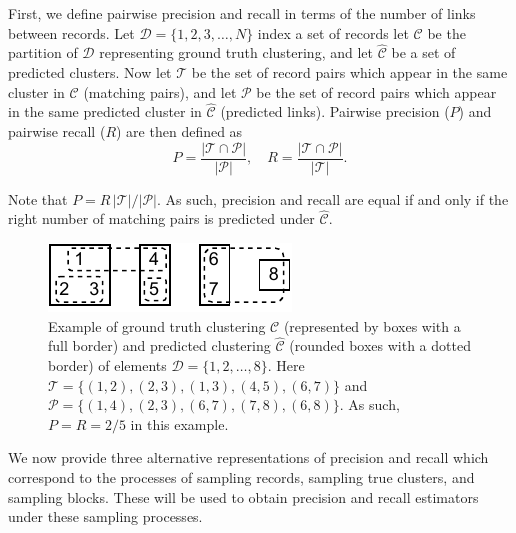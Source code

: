 \documentclass[fontsize=11pt]{article}
\newcommand{\ob}[1]{{\color{purple}#1}}
\theoremstyle{definition}
\begin{document}
First, we define pairwise precision and recall in terms of the number of links between records. Let $\mathcal{D} = \{1, 2, 3, \dots, N\}$ index a set of records let $\mathcal{C}$ be the partition of $\mathcal{D}$ representing ground truth clustering, and let $\widehat{\mathcal{C}}$ be a set of predicted clusters. Now let $\mathcal{T}$ be the set of record pairs which appear in the same cluster in $\mathcal{C}$ (matching pairs), and let $\mathcal{P}$ be the set of record pairs which appear in the same predicted cluster in $\widehat{\mathcal{C}}$ (predicted links). Pairwise precision ($P$) and pairwise recall ($R$) are then defined as
\begin{equation}\label{eq:def_P_R}
    P = \frac{\lvert \mathcal{T} \cap \mathcal{P} \rvert}{\lvert \mathcal{P} \rvert}, \quad R = \frac{\lvert \mathcal{T} \cap \mathcal{P} \rvert}{\lvert \mathcal{T} \rvert}.
\end{equation}

Note that $P = R \, \lvert \mathcal{T} \rvert / \lvert \mathcal{P} \rvert$. As such, precision and recall are equal if and only if the right number of matching pairs is predicted under $\widehat{\mathcal{C}}$.

\begin{figure}[h]
    \centering
    \includegraphics{paper/clustering-example.pdf}
    \caption{\ob{Example of ground truth clustering $\mathcal{C}$ (represented by boxes with a full border) and predicted clustering $\widehat{\mathcal{C}}$ (rounded boxes with a dotted border) of elements $\mathcal{D} = \{1,2,\dots, 8\}$. Here $\mathcal{T} = \{(1,2), (2,3), (1,3), (4,5), (6,7)\}$ and $\mathcal{P} = \{(1,4), (2,3), (6,7), (7,8), (6,8)\}$. As such, $P = R = 2/5$ in this example.}}
    \label{fig:my_label}
\end{figure}

We now provide three alternative representations of precision and recall which correspond to the processes of sampling records, sampling true clusters, and sampling blocks. These will be used to obtain precision and recall estimators under these sampling processes.
\end{document}
